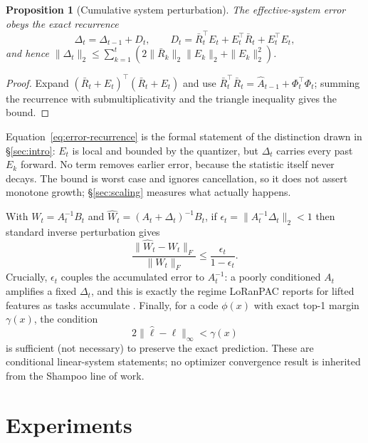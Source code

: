 \documentclass{article}
\newtheorem{proposition}{Proposition}
\begin{document}
\begin{proposition}[Cumulative system perturbation]
\label{prop:recurrence}
The effective-system error obeys the exact recurrence
\begin{equation}
\Delta_t=\Delta_{t-1}+D_t,\qquad
D_t=\bar R_t^{\top}E_t+E_t^{\top}\bar R_t+E_t^{\top}E_t,
\label{eq:error-recurrence}
\end{equation}
and hence
$\|\Delta_t\|_2\le\sum_{k=1}^{t}\left(2\|\bar R_k\|_2\|E_k\|_2+\|E_k\|_2^2\right)$.
\end{proposition}
\begin{proof}
Expand $(\bar R_t+E_t)^{\top}(\bar R_t+E_t)$ and use
$\bar R_t^{\top}\bar R_t=\widehat A_{t-1}+\Phi_t^{\top}\Phi_t$; summing the
recurrence with submultiplicativity and the triangle inequality gives the
bound.
\end{proof}

Equation~\ref{eq:error-recurrence} is the formal statement of the distinction
drawn in \S\ref{sec:intro}: $E_t$ is local and bounded by the quantizer, but
$\Delta_t$ carries every past $E_k$ forward. No term removes earlier error,
because the statistic itself never decays. The bound is worst case and ignores
cancellation, so it does not assert monotone growth; \S\ref{sec:scaling}
measures what actually happens.

With $W_t=A_t^{-1}B_t$ and $\widehat W_t=(A_t+\Delta_t)^{-1}B_t$, if
$\epsilon_t=\|A_t^{-1}\Delta_t\|_2<1$ then standard inverse perturbation gives
\begin{equation}
\frac{\|\widehat W_t-W_t\|_F}{\|W_t\|_F}\le\frac{\epsilon_t}{1-\epsilon_t}.
\label{eq:ridge-perturbation}
\end{equation}
Crucially, $\epsilon_t$ couples the accumulated error to $A_t^{-1}$: a poorly
conditioned $A_t$ amplifies a fixed $\Delta_t$, and this is exactly the regime
LoRanPAC reports for lifted features as tasks accumulate
\citep{peng2025loranpac}.
Finally, for a code $\phi(x)$ with exact top-1 margin $\gamma(x)$, the
condition
\begin{equation}
2\|\widehat\ell-\ell\|_\infty<\gamma(x)
\label{eq:margin-certificate}
\end{equation}
is sufficient (not necessary) to preserve the exact prediction. These are
conditional linear-system statements; no optimizer convergence result is
inherited from the Shampoo line of work.

\section{Experiments}
\label{sec:experiments}
\end{document}
